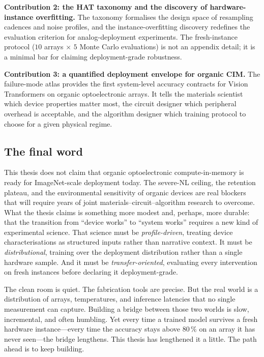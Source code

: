 \textbf{Contribution 2: the HAT taxonomy and the discovery of hardware-instance overfitting.}  The taxonomy formalises the design space of resampling cadences and noise profiles, and the instance-overfitting discovery redefines the evaluation criterion for analog-deployment experiments.  The fresh-instance protocol ($10$ arrays $\times$ $5$ Monte Carlo evaluations) is not an appendix detail; it is a minimal bar for claiming deployment-grade robustness.

\textbf{Contribution 3: a quantified deployment envelope for organic CIM.}  The failure-mode atlas provides the first system-level accuracy contracts for Vision Transformers on organic optoelectronic arrays.  It tells the materials scientist which device properties matter most, the circuit designer which peripheral overhead is acceptable, and the algorithm designer which training protocol to choose for a given physical regime.

\subsection{The final word}

This thesis does not claim that organic optoelectronic compute-in-memory is ready for ImageNet-scale deployment today.  The severe-NL ceiling, the retention plateau, and the environmental sensitivity of organic devices are real blockers that will require years of joint materials--circuit--algorithm research to overcome.  What the thesis claims is something more modest and, perhaps, more durable: that the transition from ``device works'' to ``system works'' requires a new kind of experimental science.  That science must be \emph{profile-driven}, treating device characterisations as structured inputs rather than narrative context.  It must be \emph{distributional}, training over the deployment distribution rather than a single hardware sample.  And it must be \emph{transfer-oriented}, evaluating every intervention on fresh instances before declaring it deployment-grade.

The clean room is quiet.  The fabrication tools are precise.  But the real world is a distribution of arrays, temperatures, and inference latencies that no single measurement can capture.  Building a bridge between those two worlds is slow, incremental, and often humbling.  Yet every time a trained model survives a fresh hardware instance---every time the accuracy stays above $80\,\%$ on an array it has never seen---the bridge lengthens.  This thesis has lengthened it a little.  The path ahead is to keep building.
